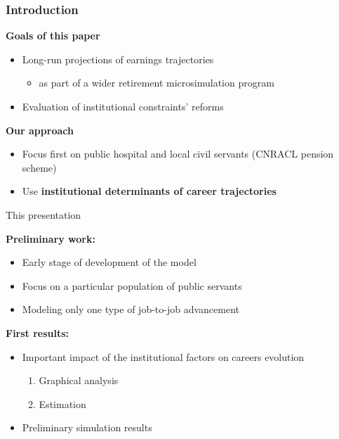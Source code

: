 \documentclass[xcolor=table,ignorenonframetext,12pt]{beamer}
\newenvironment{choixmarges}[2]{\begin{list}{}{%
\setlength{\topsep}{0pt}%
\setlength{\leftmargin}{0pt}%
\setlength{\rightmargin}{0pt}%
\setlength{\listparindent}{\parindent}%
\setlength{\itemindent}{\parindent}%
\setlength{\parsep}{0pt plus 1pt}%
\addtolength{\leftmargin}{#1}%
\addtolength{\rightmargin}{#2}%
}\item }{\end{list}}
\begin{document}
\begin{frame}
\frametitle{Introduction}

\begin{choixmarges}{-0.5cm}{-0.5cm}
\textbf{Goals of this paper}
\begin{itemize}
	\item Long-run projections of earnings trajectories
	\begin{itemize}
		\item as part of a wider retirement microsimulation program
	\end{itemize}
	\item Evaluation of institutional constraints' reforms
\end{itemize}

\textbf{Our approach}
\begin{itemize}
	\item Focus first on public hospital and local civil servants (CNRACL pension scheme)
	\item Use \textbf{institutional determinants of career trajectories}
\end{itemize}

	
%	

\end{choixmarges}
\end{frame}




\begin{frame}{This presentation}
\begin{choixmarges}{-0.2cm}{-0.2cm}


\centerline{\textbf {Preliminary work:}} 
\vspace{0.15cm}
	\begin{itemize}
	\item Early stage of development of the model
	\item Focus on a particular population of public servants
	\item Modeling only one type of job-to-job advancement
	\end{itemize}
	
\vspace{0.4cm}
\centerline{\textbf {First results:}}
	\begin{itemize}
	\item Important impact of the institutional factors on careers evolution
	\begin{enumerate}
	\item Graphical analysis
	\item Estimation
	\end{enumerate}
	\item Preliminary simulation results
	\end{itemize}

\end{choixmarges}
\end{frame}
\end{document}
